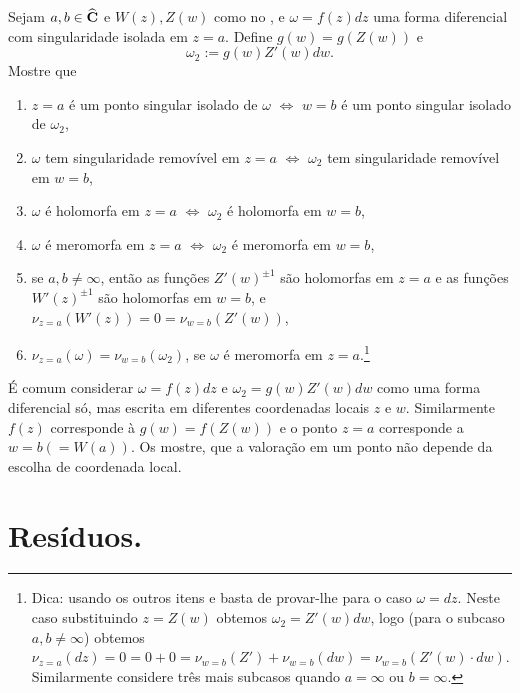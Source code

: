 \begin{problema}
\label{p:valoracao-forma-independencia}
Sejam $a,b\in\widehat{\mathbf{C}}$ e $W(z),Z(w)$ como no ,
e $\omega = f(z) dz$ uma forma diferencial com singularidade isolada em $z=a$.
Define $g(w) = g(Z(w))$ e
\[ \omega_2 := g(w) Z'(w) dw. \]
Mostre que
\begin{enumerate}
\item $z=a$ é um ponto singular isolado de $\omega$ $\iff$ $w=b$ é um ponto singular isolado de $\omega_2$,
\item $\omega$ tem singularidade removível em $z=a$ $\iff$ $\omega_2$ tem singularidade removível em $w=b$,
\item $\omega$ é holomorfa em $z=a$ $\iff$ $\omega_2$ é holomorfa em $w=b$,
\item $\omega$ é meromorfa em $z=a$ $\iff$ $\omega_2$ é meromorfa em $w=b$,
\item se $a,b\neq\infty$, então
as funções $Z'(w)^{\pm 1}$ são holomorfas em $z=a$
e as funções $W'(z)^{\pm 1}$ são holomorfas em $w=b$,
e $\nu_{z=a} (W'(z)) = 0 = \nu_{w=b} (Z'(w))$,
\item $\nu_{z=a}(\omega) = \nu_{w=b}(\omega_2)$, se $\omega$ é meromorfa em $z=a$.\footnote{Dica:
usando os outros itens e 
basta de provar-lhe para o caso $\omega = dz$. Neste caso substituindo $z = Z(w)$
obtemos $\omega_2 = Z'(w) dw$, logo (para o subcaso $a,b\neq\infty$) obtemos
$\nu_{z=a} (dz) = 0 = 0+0 = \nu_{w=b}(Z') + \nu_{w=b}(dw) = \nu_{w=b}(Z'(w)\cdot dw)$.
Similarmente considere três mais subcasos quando $a=\infty$ ou $b=\infty$. }
\end{enumerate}
\end{problema}

É comum considerar $\omega = f(z) dz$ e $\omega_2 = g(w) Z'(w) dw$ como uma forma diferencial só,
mas escrita em diferentes coordenadas locais $z$ e $w$. 
Similarmente $f(z)$ corresponde à $g(w) = f(Z(w))$
e o ponto $z=a$ corresponde a $w=b (=W(a))$.
Os  mostre, que
a valoração em um ponto não depende da escolha de coordenada local.


\section{Resíduos.}

